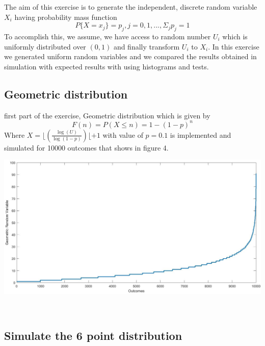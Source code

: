 The aim of this exercise is to generate the independent, discrete random variable $X_{i}$ having probability mass function 
\begin{equation}
    P\{X=x_{j}\} =p_{j},   j=0,1,...,\Sigma_{j}p_j=1
\end{equation}
To accomplish this, we assume, we have access to random number $U_{i}$ which is uniformly distributed over $(0,1)$ and finally transform $U_{i}$ to $X_{i}$. In this exercise we generated uniform random variables and we compared the results obtained in simulation with expected results with using histograms and tests.\\
\subsection{Geometric distribution}
first part of the exercise, Geometric distribution which is given by 
\begin{equation}
    F(n)=P(X\leq n)=1-(1-p)^n
\end{equation}
Where $X=\lfloor{(\frac{\log(U)}{\log(1-p)})}\lfloor+1$ with value of $p = 0.1$ is implemented and simulated for 10000 outcomes that shows in figure 4.\
\begin{center}
    \includegraphics[scale=0.3]{Figures/figure2_1.jpg}\\
\end{center}\\
\subsection{Simulate the 6 point distribution}


